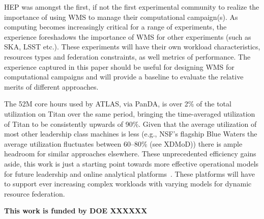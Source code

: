 
HEP was amongst the first, if not the first experimental community to realize
the importance of using WMS to manage their computational campaign(s). As
computing becomes increasingly critical for a range of experiments, the
experience foreshadows the importance of WMS for other experiments (such as
SKA, LSST etc.).  These experiments will have their own workload
characteristics, resources types and federation constraints, as well metrics
of performance. The experience captured in this paper should be useful
for designing WMS for computational campaigns and will provide a baseline to
evaluate the relative merits of different approaches.

The 52M core hours used by ATLAS, via PanDA, is over 2\% of the total
utilization on Titan over the same period, bringing the time-averaged
utilization of Titan to be consistently upwards of 90\%. Given that the
average utilization of most other leadership class machines is less (e.g.,
NSF's flagship Blue Waters the average utilization fluctuates between
60--80\% (see XDMoD\cite{bw-sucks})) there is ample headroom for similar
approaches elsewhere. These unprecedented efficiency gains aside, this work
is just a starting point towards more effective operational models for future
leadership and online analytical platforms~\cite{foap-url}. These platforms
will have to support ever increasing complex workloads with varying models
for dynamic resource federation.

{\bf \footnotesize This work is funded by DOE XXXXXX \par}


